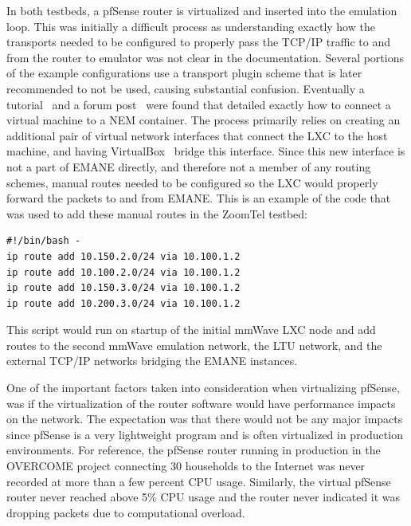 In both testbeds, a pfSense router is virtualized and inserted into the emulation loop.
This was initially a difficult process as understanding exactly how the transports needed to be configured to properly pass the TCP/IP traffic to and from the router to emulator was not clear in the documentation.
Several portions of the example configurations use a transport plugin scheme that is later recommended to not be used, causing substantial confusion.
Eventually a tutorial~\cite{letce2_git} and a forum post~\cite{issues_git} were found that detailed exactly how to connect a virtual machine to a NEM container.
The process primarily relies on creating an additional pair of virtual network interfaces that connect the LXC to the host machine, and having VirtualBox~\cite{virtualbox} bridge this interface.
Since this new interface is not a part of EMANE directly, and therefore not a member of any routing schemes, manual routes needed to be configured so the LXC would properly forward the packets to and from EMANE.
This is an example of the code that was used to add these manual routes in the ZoomTel testbed:
\begin{verbatim}
#!/bin/bash -
ip route add 10.150.2.0/24 via 10.100.1.2
ip route add 10.100.2.0/24 via 10.100.1.2
ip route add 10.150.3.0/24 via 10.100.1.2
ip route add 10.200.3.0/24 via 10.100.1.2
\end{verbatim}
This script would run on startup of the initial mmWave LXC node and add routes to the second mmWave emulation network, the LTU network, and the external TCP/IP networks bridging the EMANE instances.\par
One of the important factors taken into consideration when virtualizing pfSense, was if the virtualization of the router software would have performance impacts on the network.
The expectation was that there would not be any major impacts since pfSense is a very lightweight program and is often virtualized in production environments.
For reference, the pfSense router running in production in the OVERCOME project connecting 30 households to the Internet was never recorded at more than a few percent CPU usage.
Similarly, the virtual pfSense router never reached above 5\% CPU usage and the router never indicated it was dropping packets due to computational overload.

